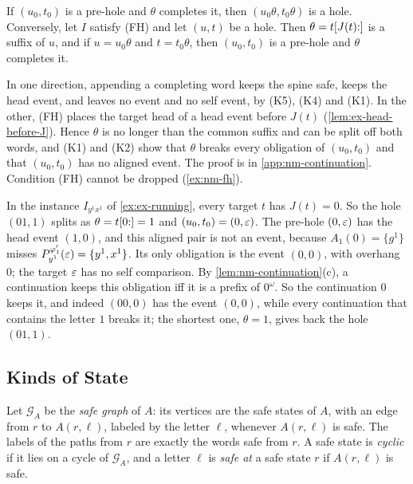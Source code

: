 \begin{lemma}\label{lem:nm-decomposition}
If $(u_0,t_0)$ is a pre-hole and $\theta$ completes it, then
$(u_0\theta,t_0\theta)$ is a hole. Conversely, let $I$ satisfy \textup{(FH)} and
let $(u,t)$ be a hole. Then $\theta=t[J(t){:}]$ is a suffix of $u$, and if
$u=u_0\theta$ and $t=t_0\theta$, then $(u_0,t_0)$ is a pre-hole and $\theta$
completes it.
\end{lemma}

In one direction, appending a completing word keeps the spine safe, keeps the
head event, and leaves no event and no self event, by (K5), (K4) and (K1). In
the other, (FH) places the target head of a head event before $J(t)$
(\cref{lem:ex-head-before-J}). Hence
$\theta$ is no longer than the common suffix and can be split off both words,
and (K1) and (K2) show that $\theta$ breaks every obligation of $(u_0,t_0)$ and
that $(u_0,t_0)$ has no aligned event. The proof is in
\cref{app:nm-continuation}. Condition (FH) cannot be dropped
(\cref{ex:nm-fh}).

\begin{example}\label{ex:nm-running}
In the instance $I_{y^1x^1}$ of \cref{ex:ex-running}, every target $t$ has
$J(t)=0$. So the hole $(01,1)$ splits as $\theta=t[0{:}]=1$ and
$(u_0,t_0)=(0,\varepsilon)$. The pre-hole $(0,\varepsilon)$ has the head event $(1,0)$,
and this aligned pair is not an event, because $A_1(0)=\{g^1\}$ misses
$P^{\varphi'_1}_{y^1}(\varepsilon)=\{y^1,x^1\}$. Its only obligation is the event
$(0,0)$, with overhang $0$; the target $\varepsilon$ has no self comparison. By
\cref{lem:nm-continuation}(c), a continuation keeps this obligation iff it is a
prefix of $0^\omega$. So the continuation $0$ keeps it, and indeed $(00,0)$
has the event $(0,0)$, while every continuation that contains the letter $1$
breaks it; the shortest one, $\theta=1$, gives back the hole $(01,1)$.
\end{example}

\subsection{Kinds of State}\label{sec:nm-kinds}

Let $\mathcal G_A$ be the \emph{safe graph} of $A$: its vertices are the safe
states of $A$, with an edge from $r$ to $A(r,\ell)$, labeled by the letter
$\ell$, whenever $A(r,\ell)$ is safe. The labels of the paths from $r$ are
exactly the words safe from $r$. A safe state is \emph{cyclic} if it lies on a
cycle of $\mathcal G_A$, and a letter $\ell$ is \emph{safe at} a safe state $r$
if $A(r,\ell)$ is safe.

